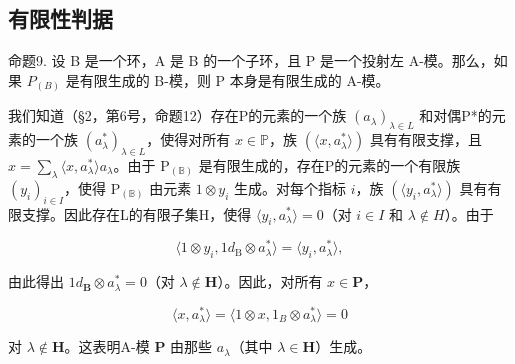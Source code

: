 \subsection{有限性判据}

命题9. 设 B 是一个环，A 是 B 的一个子环，且 P 是一个投射左 A-模。那么，如果 \(P_{(B)}\) 是有限生成的 B-模，则 P 本身是有限生成的 A-模。

我们知道（§2，第6号，命题12）存在P的元素的一个族 \((a_{\lambda})_{\lambda \in L}\) 和对偶P*的元素的一个族 \((a_{\lambda}^{*})_{\lambda \in L}\)，使得对所有 \(x \in \mathbb{P}\)，族 \((\langle x, a_{\lambda}^{*} \rangle)\) 具有有限支撑，且 \(x = \sum_{\lambda} \langle x, a_{\lambda}^{*} \rangle a_{\lambda}\)。由于 \(\mathrm{P}_{(\mathbb{B})}\) 是有限生成的，存在P的元素的一个有限族 \((y_{i})_{i \in I}\)，使得 \(\mathrm{P}_{(\mathbb{B})}\) 由元素 \(1 \otimes y_{i}\) 生成。对每个指标 \(i\)，族 \((\langle y_{i}, a_{\lambda}^{*} \rangle)\) 具有有限支撑。因此存在L的有限子集H，使得 \(\langle y_{i}, a_{\lambda}^{*} \rangle = 0\)（对 \(i \in I\) 和 \(\lambda \notin H\)）。由于

\[
\langle 1 \otimes y _ {i}, 1 d _ {\mathrm{B}} \otimes a _ {\lambda} ^ {*} \rangle = \langle y _ {i}, a _ {\lambda} ^ {*} \rangle ,
\]

由此得出 \(1d_{\mathbf{B}} \otimes a_{\lambda}^{*} = 0\)（对 \(\lambda \notin \mathbf{H}\)）。因此，对所有 \(x \in \mathbf{P}\)，

\[
\langle x, a _ {\lambda} ^ {*} \rangle = \langle 1 \otimes x, 1 _ {B} \otimes a _ {\lambda} ^ {*} \rangle = 0
\]

对 \(\lambda \notin \mathbf{H}\)。这表明A-模 \(\mathbf{P}\) 由那些 \(a_{\lambda}\)（其中 \(\lambda \in \mathbf{H}\)）生成。

